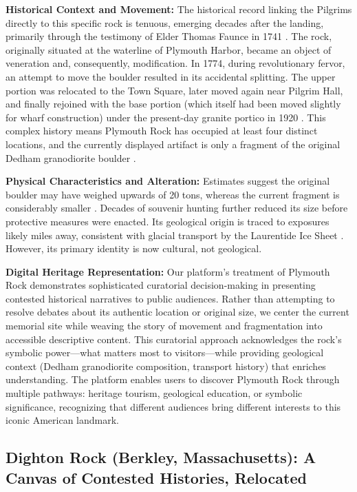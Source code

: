 \textbf{Historical Context and Movement:} The historical record linking the Pilgrims directly to this specific rock is tenuous, emerging decades after the landing, primarily through the testimony of Elder Thomas Faunce in 1741 \cite{Seelye1997}. The rock, originally situated at the waterline of Plymouth Harbor, became an object of veneration and, consequently, modification. In 1774, during revolutionary fervor, an attempt to move the boulder resulted in its accidental splitting. The upper portion was relocated to the Town Square, later moved again near Pilgrim Hall, and finally rejoined with the base portion (which itself had been moved slightly for wharf construction) under the present-day granite portico in 1920 \cite{Seelye1997}. This complex history means Plymouth Rock has occupied at least four distinct locations, and the currently displayed artifact is only a fragment of the original Dedham granodiorite boulder \cite{Emerson1917}.

\textbf{Physical Characteristics and Alteration:} Estimates suggest the original boulder may have weighed upwards of 20 tons, whereas the current fragment is considerably smaller \cite{Emerson1917}. Decades of souvenir hunting further reduced its size before protective measures were enacted. Its geological origin is traced to exposures likely miles away, consistent with glacial transport by the Laurentide Ice Sheet \cite{Emerson1917}. However, its primary identity is now cultural, not geological.

\textbf{Digital Heritage Representation:} Our platform's treatment of Plymouth Rock demonstrates sophisticated curatorial decision-making in presenting contested historical narratives to public audiences. Rather than attempting to resolve debates about its authentic location or original size, we center the current memorial site while weaving the story of movement and fragmentation into accessible descriptive content. This curatorial approach acknowledges the rock's symbolic power—what matters most to visitors—while providing geological context (Dedham granodiorite composition, transport history) that enriches understanding. The platform enables users to discover Plymouth Rock through multiple pathways: heritage tourism, geological education, or symbolic significance, recognizing that different audiences bring different interests to this iconic American landmark.

\subsection{Dighton Rock (Berkley, Massachusetts): A Canvas of Contested Histories, Relocated}
\label{subsec:dighton}

